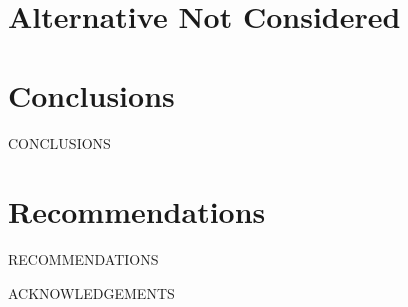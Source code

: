 \documentclass[12pt]{article}
\begin{document}
\section{Alternative Not Considered}
\newpage

\section{Conclusions}
CONCLUSIONS
\newpage

\section{Recommendations}
RECOMMENDATIONS
\newpage



\newpage


ACKNOWLEDGEMENTS
\newpage


\end{document}
